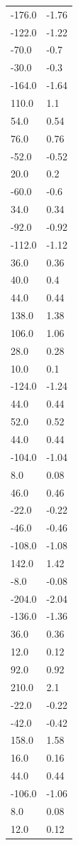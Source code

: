 \begin{longtable}{ll}
-176.0 & -1.76 \\
-122.0 & -1.22 \\
-70.0 & -0.7 \\
-30.0 & -0.3 \\
-164.0 & -1.64 \\
110.0 & 1.1 \\
54.0 & 0.54 \\
76.0 & 0.76 \\
-52.0 & -0.52 \\
20.0 & 0.2 \\
-60.0 & -0.6 \\
34.0 & 0.34 \\
-92.0 & -0.92 \\
-112.0 & -1.12 \\
36.0 & 0.36 \\
40.0 & 0.4 \\
44.0 & 0.44 \\
138.0 & 1.38 \\
106.0 & 1.06 \\
28.0 & 0.28 \\
10.0 & 0.1 \\
-124.0 & -1.24 \\
44.0 & 0.44 \\
52.0 & 0.52 \\
44.0 & 0.44 \\
-104.0 & -1.04 \\
8.0 & 0.08 \\
46.0 & 0.46 \\
-22.0 & -0.22 \\
-46.0 & -0.46 \\
-108.0 & -1.08 \\
142.0 & 1.42 \\
-8.0 & -0.08 \\
-204.0 & -2.04 \\
-136.0 & -1.36 \\
36.0 & 0.36 \\
12.0 & 0.12 \\
92.0 & 0.92 \\
210.0 & 2.1 \\
-22.0 & -0.22 \\
-42.0 & -0.42 \\
158.0 & 1.58 \\
16.0 & 0.16 \\
44.0 & 0.44 \\
-106.0 & -1.06 \\
8.0 & 0.08 \\
12.0 & 0.12 \\

\end{longtable}
